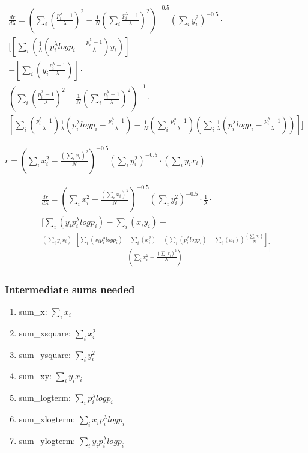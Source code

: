\begin{multline}
\frac{dr}{d\lambda}=
\left(\sum_i\left(\frac{p_i^{\lambda}-1}{\lambda}\right)^2-\frac{1}{N}\left(\sum_i \frac{p_i^{\lambda}-1}{\lambda}\right)^2  \right)^{-0.5} 
\left(\sum_i{y_i^2}\right)^{-0.5}\cdot  \\
[
\left[
\sum_i\left(\frac{1}{\lambda}\left(p_i^{\lambda}log{p_i}-\frac{p_i^{\lambda}-1}{\lambda}\right)y_i\right)
\right]  \\
-
\left[\sum_i \left(y_i\frac{p_i^{\lambda}-1}{\lambda}\right)\right]\cdot\\
\left(\sum_i\left(\frac{p_i^{\lambda}-1}{\lambda}\right)^2-\frac{1}{N}\left(\sum_i \frac{p_i^{\lambda}-1}{\lambda}\right)^2  \right)^{-1} 
\cdot\\
\left[
\sum_i\left(\frac{p_i^{\lambda}-1}{\lambda} \right)\frac{1}{\lambda}\left(p_i^{\lambda}log{p_i}-\frac{p_i^{\lambda}-1}{\lambda}\right)
-\frac{1}{N}\left(\sum_i \frac{p_i^{\lambda}-1}{\lambda}\right) \left(\sum_i \frac{1}{\lambda}\left(p_i^{\lambda}log{p_i}-\frac{p_i^{\lambda}-1}{\lambda}\right) \right)
\right]
]
\end{multline}

\begin{math}
r=\left(\sum_i{x_i^2}-\frac{\left(\sum_i{x_i}\right)^2}{N}\right)^{-0.5} 
\left(\sum_i{y_i^2}\right)^{-0.5}\cdot
\left(\sum_i{y_ix_i}\right)
\end{math}

\begin{multline}
\frac{dr}{d\lambda}=
\left(\sum_i{x_i^2}-\frac{\left(\sum_i{x_i}\right)^2}{N}\right)^{-0.5} 
\left(\sum_i{y_i^2}\right)^{-0.5}\cdot\frac{1}{\lambda}\cdot  \\
[
\sum_i\left(y_ip_i^{\lambda}log{p_i}\right) -  
\sum_i\left(x_iy_i\right)
-\\
\frac{\left(\sum_i{y_ix_i}\right) \cdot
\left[
\sum_i \left(x_ip_i^{\lambda}log{p_i}\right) - \sum_i \left(x_i^2\right)
-\left( \sum_i \left(p_i^{\lambda}log{p_i}\right) -\sum_i \left(x_i\right) \right)\frac{\left(\sum_i{x_i}\right)}{N} 
\right]}
{\left(\sum_i{x_i^2}-\frac{\left(\sum_i{x_i}\right)^2}{N}\right)}
]
\end{multline}

\subsubsection*{Intermediate sums needed}
\begin{enumerate}
\item sum\_x: $\sum_i{x_i}$
\item sum\_xsquare: $\sum_i{x_i^2}$
\item sum\_ysquare: $\sum_i{y_i^2}$
\item sum\_xy: $\sum_i{y_ix_i}$
\item sum\_logterm: $\sum_i{p_i^{\lambda}log{p_i}}$
\item sum\_xlogterm: $\sum_i{x_ip_i^{\lambda}log{p_i}}$
\item sum\_ylogterm: $\sum_i{y_ip_i^{\lambda}log{p_i}}$

\end{enumerate}

